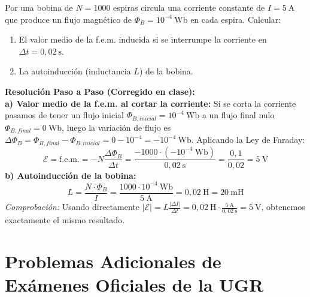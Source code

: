 \begin{ejercicio}
Por una bobina de $N = 1000$ espiras circula una corriente constante de $I = 5\ \si{\ampere}$ que produce un flujo magnético de $\Phi_B = 10^{-4}\ \si{\weber}$ en cada espira. Calcular:
\begin{enumerate}[label=\alph*)]
    \item El valor medio de la f.e.m. inducida si se interrumpe la corriente en $\Delta t = 0{,}02\ \si{\second}$.
    \item La autoinducción (inductancia $L$) de la bobina.
\end{enumerate}
\tcbline
\textbf{Resolución Paso a Paso (Corregido en clase):}\\[4pt]
\textbf{a) Valor medio de la f.e.m. al cortar la corriente:}
Si se corta la corriente pasamos de tener un flujo inicial $\Phi_{B,inicial} = 10^{-4}\ \si{\weber}$ a un flujo final nulo $\Phi_{B,final} = 0\ \si{\weber}$, luego la variación de flujo es $\Delta\Phi_B = \Phi_{B,final} - \Phi_{B,inicial} = 0 - 10^{-4} = -10^{-4}\ \si{\weber}$. Aplicando la Ley de Faraday:
\begin{equation}
    \mathcal{E} = \text{f.e.m.} = -N \frac{\Delta\Phi_B}{\Delta t} = \frac{-1000 \cdot (-10^{-4}\ \si{\weber})}{0{,}02\ \si{\second}} = \frac{0{,}1}{0{,}02} = \boxed{5\ \si{\volt}}
\end{equation}
\textbf{b) Autoinducción de la bobina:}
\begin{equation}
    L = \frac{N \cdot \Phi_B}{I} = \frac{1000 \cdot 10^{-4}\ \si{\weber}}{5\ \si{\ampere}} = \boxed{0{,}02\ \si{\henry} = 20\ \si{\milli\henry}}
\end{equation}
\footnotesize\textit{Comprobación:} Usando directamente $|\mathcal{E}| = L \frac{|\Delta I|}{\Delta t} = 0{,}02\ \si{\henry} \cdot \frac{5\ \si{\ampere}}{0{,}02\ \si{\second}} = 5\ \si{\volt}$, obtenemos exactamente el mismo resultado.
\end{ejercicio}

\section{Problemas Adicionales de Exámenes Oficiales de la UGR}

